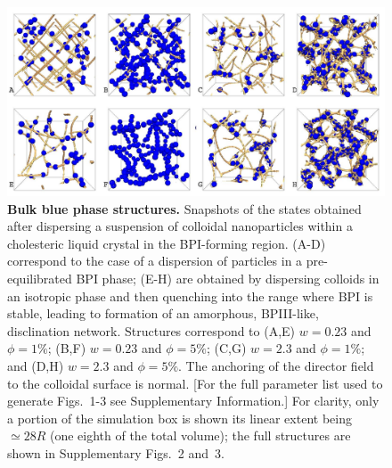 \documentclass[12pt]{article}
\begin{document}
\begin{figure}

\centerline{\includegraphics[width=\textwidth]{text-fig1.jpg}}
\caption{\textbf{Bulk blue phase structures.} Snapshots of the states
obtained after dispersing
a suspension of colloidal nanoparticles within a cholesteric liquid
crystal in the BPI-forming region. (A-D) correspond to the case
of a dispersion of particles in a pre-equilibrated BPI phase;
(E-H) are obtained by dispersing colloids in an isotropic
phase and then quenching into the range where BPI is stable, leading to formation of an amorphous, BPIII-like, disclination network.
Structures correspond
to (A,E) $w=0.23$ and $\phi=1\%$;
(B,F) $w=0.23$ and $\phi=5\%$; 
(C,G) $w=2.3$ and $\phi=1\%$; and
(D,H) $w=2.3$ and $\phi=5\%$.
The anchoring of the director field to the colloidal surface is normal.
[For the full parameter list used to generate Figs.~1-3 see Supplementary
Information.] For clarity, only a portion of the simulation box is shown
its linear extent being $\simeq 28R$
(one eighth of the total volume);
the full structures are shown in
Supplementary Figs.~2 and~3.}
\end{figure}
\end{document}
